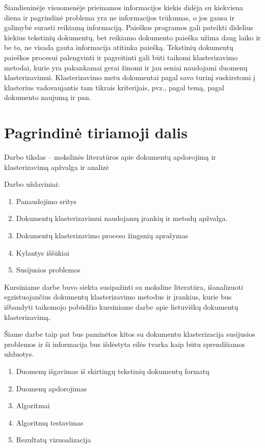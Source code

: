 \documentclass{VUMIFInfKursinis}
\begin{document}
	Šiandieninėje visuomenėje prieinamos informacijos kiekis didėja su kiekviena diena ir pagrindinė problema yra ne informacijos trūkumas, o jos gausa ir galimybė surasti reikiamą informaciją. Paieškos programos gali pateikti didelius kiekius tekstinių dokumentų, bet reikiamo dokumento paieška užima daug laiko ir be to, ne visada gauta informacija atitinka paiešką. Tekstinių dokumentų paieškos procesui palengvinti ir pagreitinti gali būti taikomi klasterizavimo metodai, kurie yra pakankamai gerai žinomi ir jau seniai naudojami duomenų klasterizavimui.  Klasterizavimo metu  dokumentai pagal savo turinį suskirstomi į klasterius vadovaujantis tam tikrais kriterijais, pvz., pagal temą, pagal dokumento naujumą ir pan. 

\section{Pagrindinė tiriamoji dalis}
	Darbo tikslas – mokslinės literatūros apie dokumentų apdorojimą ir klasterizavimą apžvalga ir analizė  

	Darbo uždaviniai: 
	\begin{enumerate}
		\item Panaudojimo sritys
		\item Dokumentų klasterizavimui naudojamų įrankių ir metodų apžvalga.
		\item Dokumentų klasterizavimo proceso žingsnių aprašymas
		\item Kylantys iššūkiai  
		\item Susijusios problemos 
	\end{enumerate}

	Kursiniame darbe buvo siekta susipažinti su moksline literatūra, išanalizuoti egzistuojančius dokumentų klasterizavimo metodus ir įrankius, kurie bus išbandyti taikomojo pobūdžio  kursiniame darbe apie lietuviškų dokumentų klasterizavimą.

	Šiame darbe taip pat bus paminėtos kitos su dokumentu klasterizacija susijusios problemos ir ši informacija bus išdėstyta eilės tvarka kaip būtu sprendžiamos užduotys.
	\begin{enumerate}
		\item Duomenų išgavimas iš skirtingų tekstinių dokumentų formatų
		\item Duomenų apdorojimas
		\item Algoritmai
		\item Algoritmų testavimas
		\item Rezultatų vizuoalizacija
	\end{enumerate}
\end{document}
